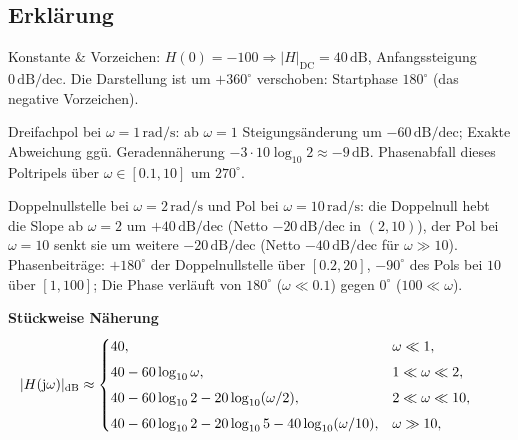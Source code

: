 \subsection{Erklärung}
\vspace{5mm}
\begin{description}[leftmargin=1.2em,labelsep=.6em,font=\bfseries]
\item[Schritt 1] Konstante \& Vorzeichen: $H(0)=-100\Rightarrow |H|_{\mathrm{DC}}=40\,\mathrm{dB}$, Anfangssteigung $0\,\mathrm{dB/dec}$. Die Darstellung ist um $+360^\circ$ verschoben: Startphase $180^\circ$ (das negative Vorzeichen).
\item[Schritt 2] Dreifachpol bei $\omega=1\,\mathrm{rad/s}$: ab $\omega=1$ Steigungsänderung um $-60\,\mathrm{dB/dec}$; Exakte Abweichung ggü. Geradennäherung $-3\cdot10\log_{10}2\approx-9\,\mathrm{dB}$. Phasenabfall dieses Poltripels über $\omega\in[0.1,10]$ um $270^\circ$.
\item[Schritt 3] Doppelnullstelle bei $\omega=2\,\mathrm{rad/s}$ und Pol bei $\omega=10\,\mathrm{rad/s}$: die Doppelnull hebt die Slope ab $\omega=2$ um $+40\,\mathrm{dB/dec}$ (Netto $-20\,\mathrm{dB/dec}$ in $(2,10)$), der Pol bei $\omega=10$ senkt sie um weitere $-20\,\mathrm{dB/dec}$ (Netto $-40\,\mathrm{dB/dec}$ für $\omega\gg10$). Phasenbeiträge: $+180^\circ$ der Doppelnullstelle über $[0.2,20]$, $-90^\circ$ des Pols bei $10$ über $[1,100]$; Die Phase verläuft von $180^\circ$ ($\omega \ll 0.1$) gegen $0^\circ$ ($100 \ll \omega$).
\end{description}

\vspace{0.5cm}
\medskip
\noindent\textbf{Stückweise Näherung}
\[
|H(\operatorname{j}\!\omega)|_{\mathrm{dB}}\approx
\begin{cases}
40,& \omega\ll1,\\[4pt]
40-60\log_{10}\omega,& 1\ll\omega\ll2,\\[4pt]
40-60\log_{10}2-20\log_{10}(\omega/2),& 2\ll\omega\ll10,\\[4pt]
40-60\log_{10}2-20\log_{10}5-40\log_{10}(\omega/10),& \omega\gg10,
\end{cases}
\qquad
\]
\newpage
